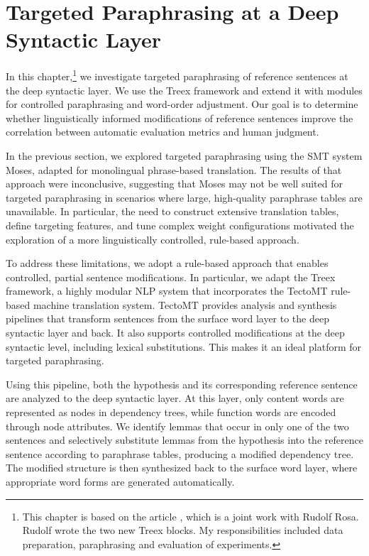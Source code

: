 \section{Targeted Paraphrasing at a Deep Syntactic Layer}
\label{treex}

In this chapter,\footnote{This chapter is based on the article \citep{barancikova-rosa-2015-targeted}, which is a joint work with Rudolf Rosa. Rudolf wrote the two new Treex blocks. My responsibilities included data preparation, paraphrasing and evaluation of experiments.} we investigate targeted paraphrasing of reference sentences at the deep syntactic layer. We use the Treex framework \citep{treex} and extend it with modules for controlled paraphrasing and word-order adjustment. Our goal is to determine whether linguistically informed modifications of reference sentences improve the correlation between automatic evaluation metrics and human judgment.

In the previous section, we explored targeted paraphrasing using the SMT system Moses, adapted for monolingual phrase-based translation. The results of that approach were inconclusive, suggesting that Moses may not be well suited for targeted paraphrasing in scenarios where large, high-quality paraphrase tables are unavailable. In particular, the need to construct extensive translation tables, define targeting features, and tune complex weight configurations motivated the exploration of a more linguistically controlled, rule-based approach.

To address these limitations, we adopt a rule-based approach that enables controlled, partial sentence modifications. In particular, we adapt the Treex \citep{treex} framework, a highly modular NLP system that incorporates the TectoMT \citep{tectomt} rule-based machine translation system. TectoMT provides analysis and synthesis pipelines that transform sentences from the surface word layer to  the deep syntactic layer and back. It also supports controlled modifications at the deep syntactic level, including lexical substitutions. This makes it an ideal platform for targeted paraphrasing.

Using this pipeline, both the hypothesis and its corresponding reference sentence are analyzed to the deep syntactic layer. At this layer, only content words are represented as nodes in dependency trees, while function words are encoded through node attributes. We identify lemmas that occur in only one of the two sentences and selectively substitute lemmas from the hypothesis into the reference sentence according to paraphrase tables, producing a modified dependency tree. The modified structure is then synthesized back to the surface word layer, where appropriate word forms are generated automatically.

